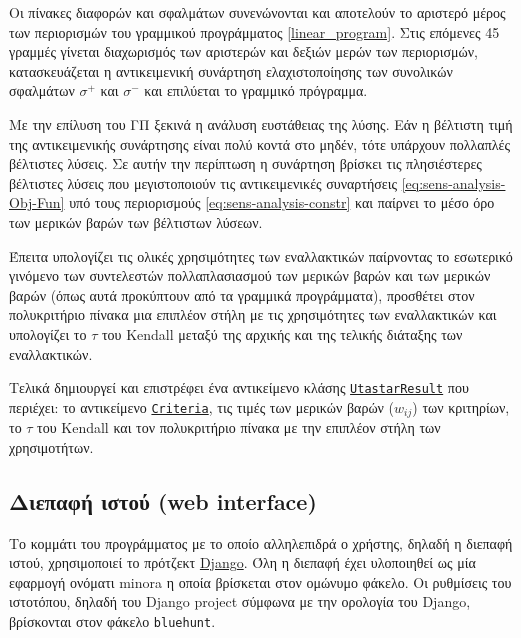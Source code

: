 \documentclass[11pt,a4paper,titlepage]{article}
\numberwithin{equation}{section}
\begin{document}
Οι πίνακες διαφορών και σφαλμάτων συνενώνονται και αποτελούν το αριστερό μέρος των περιορισμών του γραμμικού προγράμματος \eqref{linear_program}. Στις επόμενες 45 γραμμές γίνεται διαχωρισμός των αριστερών και δεξιών μερών των περιορισμών, κατασκευάζεται η αντικειμενική συνάρτηση ελαχιστοποίησης των συνολικών σφαλμάτων $ σ^{+} $ και $ σ^{-} $ και επιλύεται το γραμμικό πρόγραμμα.

Με την επίλυση του ΓΠ ξεκινά η ανάλυση ευστάθειας της λύσης. Εάν η βέλτιστη τιμή της αντικειμενικής συνάρτησης είναι πολύ κοντά στο μηδέν, τότε υπάρχουν πολλαπλές βέλτιστες λύσεις. Σε αυτήν την περίπτωση η συνάρτηση βρίσκει τις πλησιέστερες βέλτιστες λύσεις που μεγιστοποιούν τις αντικειμενικές συναρτήσεις \eqref{eq:sens-analysis-Obj-Fun} υπό τους περιορισμούς \eqref{eq:sens-analysis-constr} και παίρνει το μέσο όρο των μερικών βαρών των βέλτιστων λύσεων. 

Έπειτα υπολογίζει τις ολικές χρησιμότητες των εναλλακτικών παίρνοντας το εσωτερικό γινόμενο των συντελεστών πολλαπλασιασμού των μερικών βαρών και των μερικών βαρών (όπως αυτά προκύπτουν από τα γραμμικά προγράμματα), προσθέτει στον πολυκριτήριο πίνακα μια επιπλέον στήλη με τις χρησιμότητες των εναλλακτικών και υπολογίζει το $ \tau $
του Kendall μεταξύ της αρχικής και της τελικής διάταξης των εναλλακτικών.

Τελικά δημιουργεί και επιστρέφει ένα αντικείμενο κλάσης \hyperref[sssec:UtastarResult]{\texttt{UtastarResult}}
που περιέχει: το αντικείμενο \hyperref[sssec:Criteria]{\texttt{Criteria}}, τις τιμές των μερικών βαρών ($ w_{ij} $)
των κριτηρίων, το $ \tau $ του Kendall και τον πολυκριτήριο πίνακα με την επιπλέον στήλη των χρησιμοτήτων.


\subsection{Διεπαφή ιστού (web interface)}
\label{ssec:web-interface}
Το κομμάτι του προγράμματος με το οποίο αλληλεπιδρά ο χρήστης, δηλαδή η διεπαφή ιστού, χρησιμοποιεί το πρότζεκτ \href{https://www.djangoproject.com/}{Django}. Όλη η διεπαφή έχει υλοποιηθεί ως μία εφαρμογή ονόματι minora η οποία βρίσκεται στον ομώνυμο φάκελο. Οι ρυθμίσεις του ιστοτόπου, δηλαδή του Django project σύμφωνα με την ορολογία του Django, βρίσκονται στον φάκελο \texttt{bluehunt}.
\end{document}
